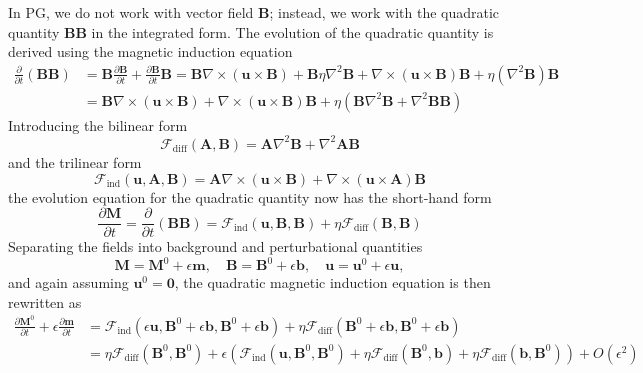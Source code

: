 In PG, we do not work with vector field $\mathbf{B}$; instead, we work with the quadratic quantity $\mathbf{B}\mathbf{B}$ in the integrated form. The evolution of the quadratic quantity is derived using the magnetic induction equation
\begin{equation}
\begin{aligned}
    \frac{\partial}{\partial t} \left(\mathbf{B} \mathbf{B}\right) &= \mathbf{B} \frac{\partial \mathbf{B}}{\partial t} + \frac{\partial \mathbf{B}}{\partial t} \mathbf{B} = \mathbf{B} \nabla\times (\mathbf{u}\times \mathbf{B}) + \mathbf{B}\eta \nabla^2 \mathbf{B} + \nabla\times (\mathbf{u}\times \mathbf{B}) \mathbf{B} + \eta \left(\nabla^2 \mathbf{B}\right) \mathbf{B} \\
    &= \mathbf{B} \nabla\times (\mathbf{u}\times \mathbf{B}) + \nabla\times (\mathbf{u}\times \mathbf{B}) \mathbf{B} + \eta \left(\mathbf{B}\nabla^2 \mathbf{B} + \nabla^2 \mathbf{B} \mathbf{B}\right)
\end{aligned}
\end{equation}
Introducing the bilinear form
\[\mathcal{F}_\mathrm{diff}(\mathbf{A}, \mathbf{B}) = \mathbf{A} \nabla^2 \mathbf{B} + \nabla^2 \mathbf{A} \mathbf{B}\]
and the trilinear form
\[\mathcal{F}_\mathrm{ind}(\mathbf{u}, \mathbf{A}, \mathbf{B}) = \mathbf{A} \nabla \times (\mathbf{u} \times \mathbf{B}) + \nabla \times (\mathbf{u} \times \mathbf{A}) \mathbf{B}\]
the evolution equation for the quadratic quantity now has the short-hand form
\begin{equation}
    \frac{\partial \mathbf{M}}{\partial t} = \frac{\partial}{\partial t} \left(\mathbf{B} \mathbf{B}\right) = \mathcal{F}_\mathrm{ind}(\mathbf{u}, \mathbf{B}, \mathbf{B}) + \eta \mathcal{F}_\mathrm{diff}(\mathbf{B}, \mathbf{B})
\end{equation}
Separating the fields into background and perturbational quantities
\[
    \mathbf{M} = \mathbf{M}^0 + \epsilon \mathbf{m},\quad 
    \mathbf{B} = \mathbf{B}^0 + \epsilon \mathbf{b},\quad 
    \mathbf{u} = \mathbf{u}^0 + \epsilon \mathbf{u},
\]
and again assuming $\mathbf{u}^0 = \mathbf{0}$, the quadratic magnetic induction equation is then rewritten as
\[
\begin{aligned}
    \frac{\partial \mathbf{M}^0}{\partial t} + \epsilon \frac{\partial \mathbf{m}}{\partial t} &= \mathcal{F}_\mathrm{ind}(\epsilon \mathbf{u}, \mathbf{B}^0 + \epsilon \mathbf{b}, \mathbf{B}^0 + \epsilon \mathbf{b}) + \eta \mathcal{F}_\mathrm{diff}(\mathbf{B}^0 + \epsilon \mathbf{b}, \mathbf{B}^0 + \epsilon \mathbf{b}) \\ 
    &= \eta \mathcal{F}_\mathrm{diff}(\mathbf{B}^0, \mathbf{B}^0) + \epsilon \left(\mathcal{F}_\mathrm{ind}(\mathbf{u}, \mathbf{B}^0, \mathbf{B}^0) + \eta \mathcal{F}_\mathrm{diff}(\mathbf{B}^0, \mathbf{b}) + \eta \mathcal{F}_\mathrm{diff}(\mathbf{b}, \mathbf{B}^0)\right) + O(\epsilon^2)
\end{aligned}
\]
